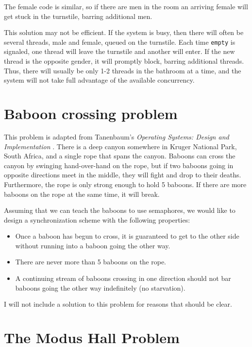 \documentclass{book}
\begin{document}
The female code is similar, so if there are men in the room an
arriving female will get stuck in the turnstile, barring additional
men.

This solution may not be efficient.  If
the system is busy, then there will often be several threads, male and
female, queued on the turnstile.  Each time {\tt empty} is signaled,
one thread will leave the turnstile and another will enter.  If the
new thread is the opposite gender, it will promptly block, barring
additional threads.  Thus, there will usually be only 1-2 threads in
the bathroom at a time, and the system will not take full advantage
of the available concurrency.


\section{Baboon crossing problem}

This problem is adapted from Tanenbaum's {\em Operating Systems:
Design and Implementation} \cite{tanenbaum}.
There is a deep canyon somewhere in
Kruger National Park, South Africa, and a single rope that spans the
canyon.  Baboons can cross the canyon by swinging hand-over-hand on
the rope, but if two baboons going in opposite directions meet in the
middle, they will fight and drop to their deaths.  Furthermore,
the rope is only strong enough to hold 5 baboons.  If there are
more baboons on the rope at the same time, it will break.

Assuming that we can teach the baboons to use semaphores, we
would like to design a synchronization scheme with the following
properties:

\begin{itemize}

\item Once a baboon has begun to cross, it is guaranteed
to get to the other side without running into a baboon going
the other way.

\item There are never more than 5 baboons on the rope.

\item A continuing stream of baboons crossing in one direction
should not bar baboons going the other way indefinitely
(no starvation).

\end{itemize}

I will not include a solution to this problem for reasons that
should be clear.


\section{The Modus Hall Problem}
\end{document}
